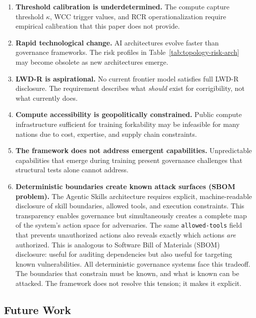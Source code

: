 \documentclass[11pt,a4paper]{article}
\theoremstyle{definition}
\begin{document}
\begin{enumerate}
    \item \textbf{Threshold calibration is underdetermined.} The compute capture threshold $\kappa$, WCC trigger values, and RCR operationalization require empirical calibration that this paper does not provide.

    \item \textbf{Rapid technological change.} AI architectures evolve faster than governance frameworks. The risk profiles in Table~\ref{tab:topology-risk-arch} may become obsolete as new architectures emerge.

    \item \textbf{LWD-R is aspirational.} No current frontier model satisfies full LWD-R disclosure. The requirement describes what \textit{should} exist for corrigibility, not what currently does.

    \item \textbf{Compute accessibility is geopolitically constrained.} Public compute infrastructure sufficient for training forkability may be infeasible for many nations due to cost, expertise, and supply chain constraints.

    \item \textbf{The framework does not address emergent capabilities.} Unpredictable capabilities that emerge during training present governance challenges that structural tests alone cannot address.

    \item \textbf{Deterministic boundaries create known attack surfaces (SBOM problem).} The Agentic Skills architecture requires explicit, machine-readable disclosure of skill boundaries, allowed tools, and execution constraints. This transparency enables governance but simultaneously creates a complete map of the system's action space for adversaries. The same \texttt{allowed-tools} field that prevents unauthorized actions also reveals exactly which actions \textit{are} authorized. This is analogous to Software Bill of Materials (SBOM) disclosure: useful for auditing dependencies but also useful for targeting known vulnerabilities. All deterministic governance systems face this tradeoff. The boundaries that constrain must be known, and what is known can be attacked. The framework does not resolve this tension; it makes it explicit.
\end{enumerate}

\subsection{Future Work}
\end{document}
